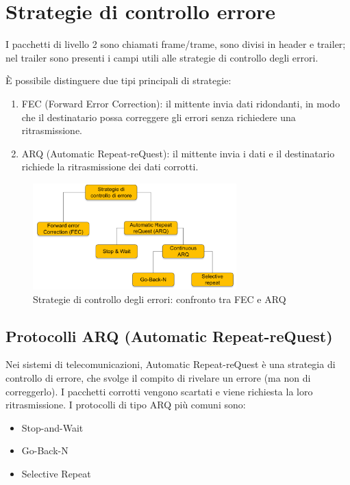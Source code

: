 
\section{Strategie di controllo errore}
I pacchetti di livello 2 sono chiamati frame/trame, sono divisi in header e trailer; nel trailer sono presenti i campi utili alle strategie di controllo degli errori.

È possibile distinguere due tipi principali di strategie:
\begin{enumerate}
    \item FEC (Forward Error Correction): il mittente invia dati ridondanti, in modo che il destinatario possa correggere gli errori senza richiedere una ritrasmissione.
    \item ARQ (Automatic Repeat-reQuest): il mittente invia i dati e il destinatario richiede la ritrasmissione dei dati corrotti. 
\end{enumerate}

\begin{figure}[htbp]
    \centering
    \includegraphics[width=0.7\textwidth]{images/strategierrore.png}
    \caption{Strategie di controllo degli errori: confronto tra FEC e ARQ}
\end{figure}

\subsection{Protocolli ARQ (Automatic Repeat-reQuest)}
Nei sistemi di telecomunicazioni, Automatic Repeat-reQuest è una strategia di controllo di errore, che svolge il compito di rivelare un errore (ma non di correggerlo). I pacchetti corrotti vengono scartati e viene richiesta la loro ritrasmissione.
I protocolli di tipo ARQ più comuni sono:

\begin{multicols}{3}
\begin{itemize}
    \item Stop-and-Wait 
    \item Go-Back-N 
    \item Selective Repeat
\end{itemize}
\end{multicols}


